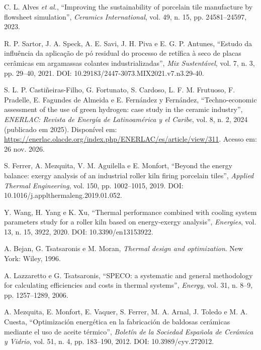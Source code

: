  C. L. Alves \textit{et al.}, ``Improving the sustainability of porcelain tile manufacture by flowsheet simulation'', \textit{Ceramics International}, vol. 49, n. 15, pp. 24581--24597, 2023.

 R. P. Sartor, J. A. Speck, A. E. Savi, J. H. Piva e E. G. P. Antunes, ``Estudo da influência da aplicação de pó residual do processo de retífica à seco de placas cerâmicas em argamassas colantes industrializadas'', \textit{Mix Sustentável}, vol. 7, n. 3, pp. 29--40, 2021. DOI: 10.29183/2447-3073.MIX2021.v7.n3.29-40.

 S. L. P. Castiñeiras-Filho, G. Fortunato, S. Cardoso, L. F. M. Frutuoso, F. Pradelle, E. Fagundes de Almeida e E. Fernández y Fernández, ``Techno-economic assessment of the use of green hydrogen: case study in the ceramic industry'', \textit{ENERLAC: Revista de Energía de Latinoamérica y el Caribe}, vol. 8, n. 2, 2024 (publicado em 2025). Disponível em: \url{https://enerlac.olacde.org/index.php/ENERLAC/es/article/view/311}. Acesso em: 26 nov. 2026.

 S. Ferrer, A. Mezquita, V. M. Aguilella e E. Monfort, ``Beyond the energy balance: exergy analysis of an industrial roller kiln firing porcelain tiles'', \textit{Applied Thermal Engineering}, vol. 150, pp. 1002--1015, 2019. DOI: 10.1016/j.applthermaleng.2019.01.052.

 Y. Wang, H. Yang e K. Xu, ``Thermal performance combined with cooling system parameters study for a roller kiln based on energy-exergy analysis'', \textit{Energies}, vol. 13, n. 15, 3922, 2020. DOI: 10.3390/en13153922.

 A. Bejan, G. Tsatsaronis e M. Moran, \textit{Thermal design and optimization}. New York: Wiley, 1996.

 A. Lazzaretto e G. Tsatsaronis, ``SPECO: a systematic and general methodology for calculating efficiencies and costs in thermal systems'', \textit{Energy}, vol. 31, n. 8--9, pp. 1257--1289, 2006.

 A. Mezquita, E. Monfort, E. Vaquer, S. Ferrer, M. A. Arnal, J. Toledo e M. A. Cuesta, ``Optimización energética en la fabricación de baldosas cerámicas mediante el uso de aceite térmico'', \textit{Boletín de la Sociedad Española de Cerámica y Vidrio}, vol. 51, n. 4, pp. 183--190, 2012. DOI: 10.3989/cyv.272012.

